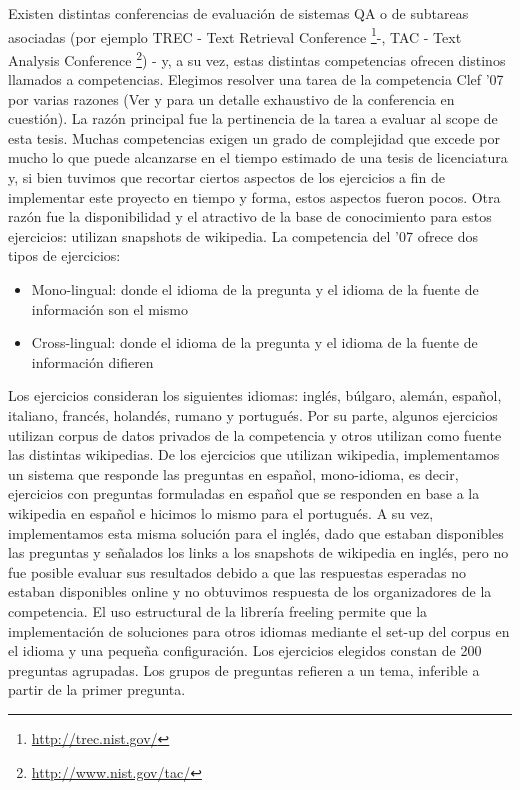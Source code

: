Existen distintas conferencias de evaluación de sistemas QA o de subtareas asociadas (por ejemplo TREC - Text Retrieval Conference \footnote{\url{http://trec.nist.gov/}}-, TAC - Text Analysis Conference \footnote{\url{http://www.nist.gov/tac/}}) - y, a su vez, estas distintas competencias ofrecen distinos llamados a competencias. Elegimos resolver una tarea de la competencia Clef '07  por varias razones (Ver \cite{GuidelineClef07} y \cite{OverviewClef07} para un detalle exhaustivo de la conferencia en cuestión). La razón principal fue la pertinencia de la tarea a evaluar al scope de esta tesis. Muchas competencias exigen un grado de complejidad que excede por mucho lo que puede alcanzarse en el tiempo estimado de una tesis de licenciatura y, si bien tuvimos que recortar ciertos aspectos de los ejercicios a fin de implementar este proyecto en tiempo y forma, estos aspectos fueron pocos.
Otra razón fue la disponibilidad y el atractivo de la base de conocimiento para estos ejercicios: utilizan snapshots de wikipedia. 
La competencia del '07 ofrece dos tipos de ejercicios:
\begin{itemize}
\item Mono-lingual: donde el idioma de la pregunta y el idioma de la fuente de información son el mismo
\item Cross-lingual: donde el idioma de la pregunta y el idioma de la fuente de información difieren
\end{itemize}
Los ejercicios consideran los siguientes idiomas: inglés, búlgaro, alemán, español, italiano, francés, holandés, rumano y portugués. Por su parte, algunos
ejercicios utilizan corpus de datos privados de la competencia y otros utilizan como fuente las distintas wikipedias. De los ejercicios que utilizan
wikipedia, implementamos un sistema que responde las preguntas en español, mono-idioma, es decir, ejercicios con preguntas formuladas en español que se responden en base a la wikipedia en español e hicimos lo mismo para el portugués. A su vez, implementamos esta misma solución para el inglés, dado que estaban disponibles las preguntas y señalados los links a los snapshots de wikipedia en inglés, pero no fue posible evaluar sus resultados debido a que las respuestas esperadas no estaban disponibles online y no obtuvimos respuesta de los organizadores de la competencia. El uso estructural de la librería freeling permite que la implementación de soluciones para otros idiomas mediante el set-up del corpus en el idioma y una pequeña configuración. 
Los ejercicios elegidos constan de 200 preguntas agrupadas. Los grupos de preguntas refieren a un tema, inferible a partir de la primer pregunta.

